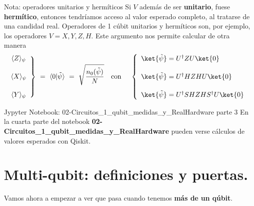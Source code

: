 \documentclass[a4paper,11pt]{book} %
\numberwithin{equation}{chapter}
\newcommand{\braket}[2]{\langle #1|#2\rangle}
\begin{document}
	\begin{mybox_blue}{Nota: operadores unitarios y hermíticos}
	Si $V$ además de ser \textbf{unitario}, fuese \textbf{hermítico}, entonces tendríamos acceso al valor esperado completo, 
	al tratarse de una candidad real. 
	Operadores de 1 cúbit unitarios y hermíticos son, por ejemplo, los operadores $V = X,Y,Z,H$. 	
	Este argumento nos permite calcular de otra manera 	
	\begin{equation} \label{ec_medidas1_valores_esperados_XYZ}
	\left. 
	\begin{array}{c} \langle Z\rangle_\psi \\ \rule{0mm}{8mm} \langle X\rangle_\psi \\ \rule{0mm}{8mm} \langle Y\rangle_\psi \end{array}
	\right\} ~=~\braket{0}{\tilde\psi} ~=~ \sqrt{\frac{n_{0}(\tilde\psi)}{N}} ~~~\hbox{con}~~~~
	\left\{ 
	\begin{array}{l}  \ket{\tilde \psi} = U^\dagger  Z  U\ket{0} \\ \rule{0mm}{8mm} \ket{\tilde \psi} = U^\dagger H Z H U\ket{0}  \\ 
	\rule{0mm}{8mm}  \ket{\tilde \psi} = U^\dagger SH Z HS^\dagger U\ket{0} \end{array}
	\right.
	\end{equation}
	
	\end{mybox_blue}
	
	
	\begin{mybox_orange}{Jypyter Notebook: 02-Circuitos\_1\_qubit\_medidas\_y\_RealHardware parte 3}
	En la cuarta parte del notebook \textbf{02-Circuitos\_1\_qubit\_medidas\_y\_RealHardware} pueden verse cálculos de valores esperados con Qiskit.
	\end{mybox_orange}
    
		
		
		
		
		
		
		
		
		
		
		
		
		
		
		


\chapter{Multi-qubit: definiciones y puertas.}

Vamos ahora a empezar a ver que pasa cuando tenemos \textbf{más de un qúbit}. 
\end{document}
